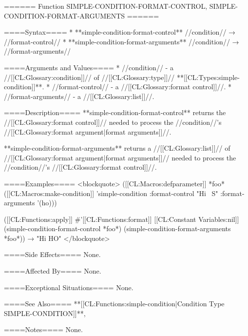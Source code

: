 ====== Function SIMPLE-CONDITION-FORMAT-CONTROL, SIMPLE-CONDITION-FORMAT-ARGUMENTS ======

====Syntax====
  * **simple-condition-format-control** //condition// → //format-control//
  * **simple-condition-format-arguments** //condition// → //format-arguments//

====Arguments and Values====
  * //condition// - a //[[CL:Glossary:condition]]// of //[[CL:Glossary:type]]// **[[CL:Types:simple-condition]]**.
  * //format-control// - a //[[CL:Glossary:format control]]//.
  * //format-arguments// - a //[[CL:Glossary:list]]//.

====Description====
**simple-condition-format-control** returns the //[[CL:Glossary:format control]]// needed to process the //condition//'s //[[CL:Glossary:format argument|format arguments]]//.

**simple-condition-format-arguments** returns a //[[CL:Glossary:list]]// of //[[CL:Glossary:format argument|format arguments]]// needed to process the //condition//'s //[[CL:Glossary:format control]]//.

====Examples====
<blockquote>
([[CL:Macros:defparameter]] *foo* 
  ([[CL:Macros:make-condition]] 'simple-condition :format-control "Hi ~S" :format-arguments '(ho)))

([[CL:Functions:apply]] #'[[CL:Functions:format]] [[CL:Constant Variables:nil]] 
      (simple-condition-format-control *foo*) 
      (simple-condition-format-arguments *foo*)) → "Hi HO"
</blockquote>

====Side Effects====
None.

====Affected By====
None.

====Exceptional Situations====
None.

====See Also====
**[[CL:Functions:simple-condition|Condition Type SIMPLE-CONDITION]]**, {\secref\ConditionSystemConcepts}

====Notes====
None.

